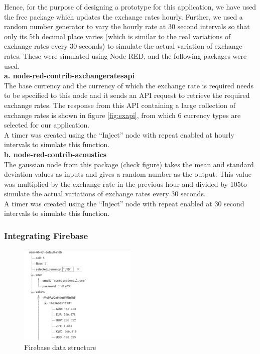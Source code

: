 Hence, for the purpose of designing a prototype for this application, we have used the free package which updates the exchange rates hourly. Further, we used a random number generator to vary the hourly rate at 30 second intervals so that only its 5th decimal place varies (which is similar to the real variations of exchange rates every 30 seconds) to simulate the actual variation of exchange rates. These were simulated using Node-RED, and the following packages were used.\\

\textbf{a. node-red-contrib-exchangeratesapi \cite{api}}\\

The base currency and the currency of which the exchange rate is required needs to be specified to this node and it sends an API request to retrieve the required exchange rates. The response from this API containing a large collection of exchange rates is shown in figure \ref{fig:exapi}, from which 6 currency types are selected for our application.\\

A timer was created using the “Inject” node with repeat enabled at hourly intervals to simulate this function.\\

\textbf{b. node-red-contrib-acoustics \cite{acoustics}}\\

The gaussian node from this package (check figure) takes the mean and standard deviation values as inputs and gives a random number as the output. This value was multiplied by the exchange rate in the previous hour and divided by 105to simulate the actual variations of exchange rates every 30 seconds.\\

A timer was created using the “Inject” node with repeat enabled at 30 second intervals to simulate this function.


\subsubsection{Integrating Firebase}

\begin{figure}[H]
    \centering
      \includegraphics[width=0.5\textwidth]{images/fire.png}
    \caption{Firebase data structure}
    \label{fig:fire}
\end{figure}

